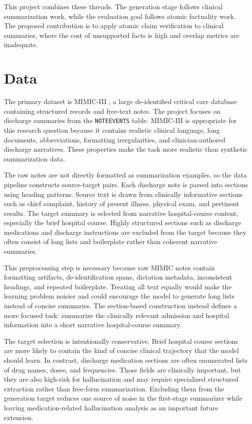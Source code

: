 \documentclass[11pt]{article}
\begin{document}
This project combines these threads. The generation stage follows clinical summarization work, while the evaluation goal follows atomic factuality work. The proposed contribution is to apply atomic claim verification to clinical summaries, where the cost of unsupported facts is high and overlap metrics are inadequate.

\section{Data}

The primary dataset is MIMIC-III \cite{johnson2016mimic}, a large de-identified critical care database containing structured records and free-text notes. The project focuses on discharge summaries from the \texttt{NOTEEVENTS} table. MIMIC-III is appropriate for this research question because it contains realistic clinical language, long documents, abbreviations, formatting irregularities, and clinician-authored discharge narratives. These properties make the task more realistic than synthetic summarization data.

The raw notes are not directly formatted as summarization examples, so the data pipeline constructs source-target pairs. Each discharge note is parsed into sections using heading patterns. Source text is drawn from clinically informative sections such as chief complaint, history of present illness, physical exam, and pertinent results. The target summary is selected from narrative hospital-course content, especially the brief hospital course. Highly structured sections such as discharge medications and discharge instructions are excluded from the target because they often consist of long lists and boilerplate rather than coherent narrative summaries.

This preprocessing step is necessary because raw MIMIC notes contain formatting artifacts, de-identification spans, dictation metadata, inconsistent headings, and repeated boilerplate. Treating all text equally would make the learning problem noisier and could encourage the model to generate long lists instead of concise summaries. The section-based construction instead defines a more focused task: summarize the clinically relevant admission and hospital information into a short narrative hospital-course summary.

The target selection is intentionally conservative. Brief hospital course sections are more likely to contain the kind of concise clinical trajectory that the model should learn. In contrast, discharge medication sections are often enumerated lists of drug names, doses, and frequencies. Those fields are clinically important, but they are also high-risk for hallucination and may require specialized structured extraction rather than free-form summarization. Excluding them from the generation target reduces one source of noise in the first-stage summarizer while leaving medication-related hallucination analysis as an important future extension.
\end{document}
